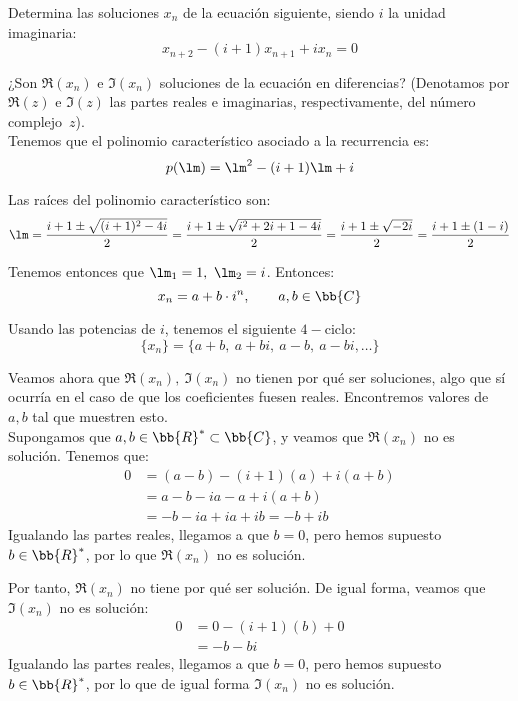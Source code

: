 \begin{ejercicio}
    Determina las soluciones $x_n$ de la ecuación siguiente, siendo $i$ la unidad imaginaria:
    \begin{equation*}
        x_{n+2} - (i + 1)x_{n+1} + ix_n = 0
    \end{equation*}
    
    ¿Son $\Re(x_n)$ e $\Im(x_n)$ soluciones de la ecuación en diferencias? (Denotamos por $\Re(z)$ e $\Im(z)$ las partes reales e imaginarias, respectivamente, del número complejo~$z$).\\

    Tenemos que el polinomio característico asociado a la recurrencia es:
    \begin{equation*}
        p(\lm)=\lm^2-(i+1)\lm + i
    \end{equation*}

    Las raíces del polinomio característico son:
    \begin{equation*}
        \lm = \frac{i+1 \pm \sqrt{(i+1)^2-4i}}{2}
        = \frac{i+1 \pm \sqrt{i^2+2i+1-4i}}{2}
        = \frac{i+1 \pm \sqrt{-2i}}{2}
        = \frac{i+1 \pm (1-i)}{2}
    \end{equation*}

    Tenemos entonces que $\lm_1=1,~\lm_2=i$. Entonces:
    \begin{equation*}
        x_n = a + b\cdot i^n,\qquad a,b\in \bb{C}
    \end{equation*}

    Usando las potencias de $i$, tenemos el siguiente $4-$ciclo:
    \begin{equation*}
        \{x_n\} = \{a+b,~a+bi,~a-b,~a-bi,\dots\}
    \end{equation*}

    Veamos ahora que $\Re(x_n),~\Im(x_n)$ no tienen por qué ser soluciones, algo que sí ocurría en el caso de que los coeficientes fuesen reales. Encontremos valores de $a,b$ tal que muestren esto. \\
    
    Supongamos que $a,b\in \bb{R}^\ast\subset \bb{C}$, y veamos que $\Re(x_n)$ no es solución. Tenemos que:
    \begin{align*}
        0 &= (a-b) - (i+1)(a) + i(a+b)\\
        &= a-b-ia-a+i(a+b)\\
        &= -b-ia+ia+ib = -b +ib
    \end{align*}
    Igualando las partes reales, llegamos a que $b=0$, pero hemos supuesto $b\in \bb{R}^\ast$, por lo que $\Re(x_n)$ no es solución.
    
    Por tanto, $\Re(x_n)$ no tiene por qué ser solución. De igual forma, veamos que $\Im(x_n)$ no es solución:
    \begin{align*}
        0 &= 0 - (i+1)(b) + 0\\
        &= -b-bi
    \end{align*}
    Igualando las partes reales, llegamos a que $b=0$, pero hemos supuesto $b\in \bb{R}^\ast$, por lo que de igual forma $\Im(x_n)$ no es solución.
\end{ejercicio}